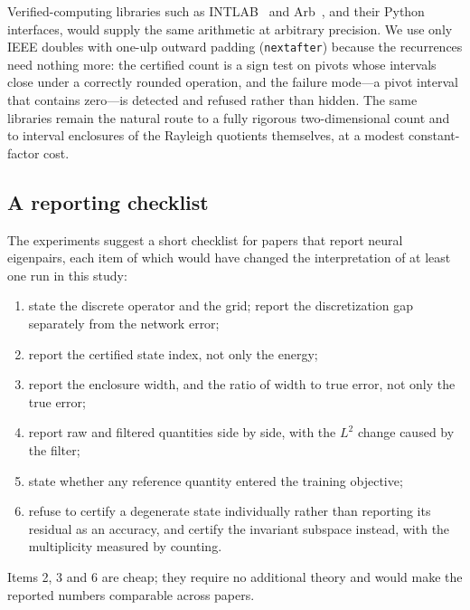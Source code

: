 Verified-computing libraries such as INTLAB~\citep{rump1999} and
Arb~\citep{johansson2017}, and their Python interfaces, would supply the same
arithmetic at arbitrary precision. We use only IEEE doubles with one-ulp
outward padding (\texttt{nextafter}) because the recurrences need nothing
more: the certified count is a sign test on pivots whose intervals close under
a correctly rounded operation, and the failure mode---a pivot interval that
contains zero---is detected and refused rather than hidden. The same libraries
remain the natural route to a fully rigorous two-dimensional count and to
interval enclosures of the Rayleigh quotients themselves, at a modest
constant-factor cost.

\subsection{A reporting checklist}

The experiments suggest a short checklist for papers that report neural
eigenpairs, each item of which would have changed the interpretation of at
least one run in this study:
\begin{enumerate}
\item state the discrete operator and the grid; report the discretization gap
  separately from the network error;
\item report the certified state index, not only the energy;
\item report the enclosure width, and the ratio of width to true error, not
  only the true error;
\item report raw and filtered quantities side by side, with the $L^2$ change
  caused by the filter;
\item state whether any reference quantity entered the training objective;
\item refuse to certify a degenerate state individually rather than reporting
  its residual as an accuracy, and certify the invariant subspace instead,
  with the multiplicity measured by counting.
\end{enumerate}
Items 2, 3 and 6 are cheap; they require no additional theory and would make
the reported numbers comparable across papers.
